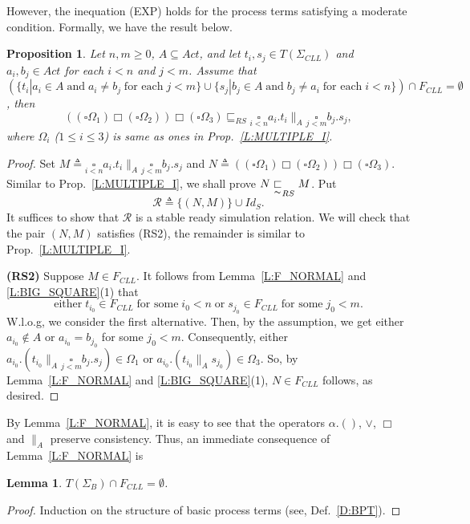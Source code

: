 \documentclass{elsarticle}
\theoremstyle{plain}
\newtheorem{lemma}[theorem]{Lemma}
\newtheorem{proposition}[theorem]{Proposition}
\theoremstyle{definition}
\begin{document}
However, the inequation (EXP) holds for the process terms satisfying a moderate condition. Formally, we have the result below.

\begin{proposition}\label{L:MULTIPLE_IV}
Let $n,m\geq0$, $A \subseteq Act$, and let $t_i,s_j \in T(\Sigma_{CLL})$ and
$a_i,b_j\in Act$ for each $i<n$ and $j<m$.
Assume that $(\{t_i|a_i\in A\;\text{and}\; a_i\neq b_j\;\text{for each}\; j<m\}\cup \{s_j|b_j\in A\;\text{and}\; b_j\neq a_i\;\text{for each}\;i<n\}) \cap F_{CLL} =\emptyset$,
 then \[((\square \Omega_1) \Box (\square \Omega_2)) \Box (\square \Omega_3) \sqsubseteq_{RS}    \underset{i< n}{\square}a_i.t_i \parallel_A \underset{j< m}{\square}b_j.s_j,\]
where $\Omega_i$ ($1\leq i\leq 3$) is same as ones in Prop.~\ref{L:MULTIPLE_I}.
\end{proposition}
\begin{proof}
  Set $M \triangleq \underset{i< n}{\square}a_i.t_i \parallel_A \underset{j< m}{\square}b_j.s_j$ and $N \triangleq  ((\square \Omega_1) \Box (\square \Omega_2)) \Box (\square \Omega_3)$.
  Similar to Prop.~\ref{L:MULTIPLE_I}, we shall prove $N\underset{\thicksim}{\sqsubset}_{RS} M$. Put
  \[{\mathcal R}\triangleq\{(N,M)\}\cup Id_S.\]
  It suffices to show that $\mathcal R$ is a stable ready simulation relation. We will check that the pair $(N, M)$ satisfies (RS2), the remainder is similar to Prop.~\ref{L:MULTIPLE_I}.

  \textbf{(RS2)} Suppose $M \in F_{CLL}$. It follows from Lemma~\ref{L:F_NORMAL} and \ref{L:BIG_SQUARE}(1) that
  \[\text{either}\;t_{i_0} \in F_{CLL}\;\text{for some}\;i_0<n\;\text{or}\; s_{j_0} \in F_{CLL}\;\text{for some}\; j_0<m. \]
  W.l.o.g, we consider the first alternative.
  Then, by the assumption, we get either $a_{i_0} \notin A$ or $a_{i_0} = b_{j_0}$ for some $j_0 < m$.
  Consequently, either $a_{i_0}.(t_{i_0} \parallel_A \underset{j< m}{\square}b_j.s_j) \in \Omega_1$ or $a_{i_0}.(t_{i_0} \parallel_A s_{j_0}) \in \Omega_3$.
  So, by Lemma~\ref{L:F_NORMAL} and \ref{L:BIG_SQUARE}(1), $N\in F_{CLL}$ follows, as desired.
\end{proof}



By Lemma~\ref{L:F_NORMAL}, it is easy to see that the operators $\alpha.()$, $\vee$, $\Box$ and $\parallel_A$ preserve consistency. Thus, an immediate consequence of Lemma~\ref{L:F_NORMAL} is

\begin{lemma}\label{L:BPT}
  $T(\Sigma_B)\cap F_{CLL}=\emptyset$.
\end{lemma}
\begin{proof}
  Induction on the structure of basic process terms (see, Def.~\ref{D:BPT}).
\end{proof}
\end{document}
